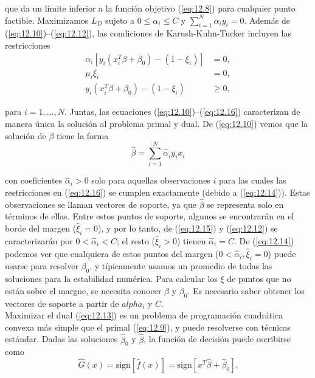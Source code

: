 que da un límite inferior a la función objetivo (\ref{eq:12.8}) para cualquier punto factible. Maximizamos $L_D$ sujeto a $0 \leq \alpha_i \leq C$ y $\sum_{i=1}^N \alpha_i y_i = 0$. Además de (\ref{eq:12.10})–(\ref{eq:12.12}), las condiciones de Karush-Kuhn-Tucker incluyen las restricciones
\begin{align}
\alpha_i [y_i (x_i^T \beta + \beta_0) - (1 - \xi_i)] &= 0, \label{eq:12.14}\\
\mu_i \xi_i &= 0, \label{eq:12.15} \\
y_i (x_i^T \beta + \beta_0) - (1 - \xi_i) &\geq 0, \label{eq:12.16}
\end{align}

para $i = 1, \ldots, N$. Juntas, las ecuaciones (\ref{eq:12.10})–(\ref{eq:12.16}) caracterizan de manera única la solución al problema primal y dual. De (\ref{eq:12.10}) vemos que la solución de $\beta$ tiene la forma 
\begin{equation}
\hat{\beta} = \sum_{i=1}^N \hat{\alpha}_i y_i x_i
\label{eq:12.17}    
\end{equation}

con coeficientes $\hat{\alpha}_i > 0$ solo para aquellas observaciones $i$ para las cuales las restricciones en (\ref{eq:12.16}) se cumplen exactamente (debido a (\ref{eq:12.14})). Estas observaciones se llaman vectores de soporte, ya que $\hat{\beta}$ se representa solo en términos de ellas. Entre estos puntos de soporte, algunos se encontrarán en el borde del margen ($\hat{\xi}_i = 0$), y por lo tanto, de (\ref{eq:12.15}) y (\ref{eq:12.12}) se caracterizarán por $0 < \hat{\alpha}_i < C$; el resto ($\hat{\xi}_i > 0$) tienen $\hat{\alpha}_i = C$. De (\ref{eq:12.14}) podemos ver que cualquiera de estos puntos del margen ($0 < \hat{\alpha}_i, \hat{\xi}_i = 0$) puede usarse para resolver $\beta_0$, y típicamente usamos un promedio de todas las soluciones para la estabilidad numérica. Para calcular los $\xi$ de puntos que no están sobre el margne, se necesita conocer $\beta$ y $\beta_0$. Es necesario saber obtener los vectores de soporte a partir de $alpha_i$ y $C$. \\

Maximizar el dual (\ref{eq:12.13}) es un problema de programación cuadrática convexa más simple que el primal (\ref{eq:12.9}), y puede resolverse con técnicas estándar. Dadas las soluciones $\hat{\beta}_0$ y $\hat{\beta}$, la función de decisión puede escribirse como
\begin{equation}
    \hat{G}(x) = \text{sign}[\hat{f}(x)] = \text{sign}[x^T\hat{\beta} + \hat{\beta}_0].
\end{equation}

